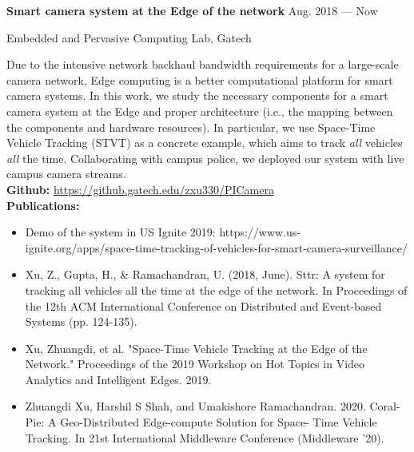 \parbox[t][][t]{\linewidth}{
	\parbox{\linewidth}{\textbf{Smart camera system at the Edge of the network}
		\hfill {{Aug. 2018 --- Now}}}
		\smallbreak
	\parbox{\linewidth}{Embedded and Pervasive Computing Lab, Gatech}
	
	\bigskip
  Due to the intensive network backhaul bandwidth requirements for a large-scale camera network, Edge computing is a better computational platform for smart camera systems.
  In this work, we study the necessary components for a smart camera system at the Edge and proper architecture (i.e., the mapping between the components and hardware resources).
  In particular, we use Space-Time Vehicle Tracking (STVT) as a concrete example, which aims to track \textit{all} vehicles \textit{all} the time.
  Collaborating with campus police, we deployed our system with live campus camera streams. \\
  \textbf{Github:} \url{https://github.gatech.edu/zxu330/PICamera} \\
  \textbf{Publications:}
	\begin{itemize}
    \item{Demo of the system in US Ignite 2019: https://www.us-ignite.org/apps/space-time-tracking-of-vehicles-for-smart-camera-surveillance/}\\
      [-1em]
    \item{Xu, Z., Gupta, H., \& Ramachandran, U. (2018, June). Sttr: A system for tracking all vehicles all the time at the edge of the network. In Proceedings of the 12th ACM International Conference on Distributed and Event-based Systems (pp. 124-135).}\\
      [-1em]
    \item{Xu, Zhuangdi, et al. "Space-Time Vehicle Tracking at the Edge of the Network." Proceedings of the 2019 Workshop on Hot Topics in Video Analytics and Intelligent Edges. 2019.}\\
      [-1em]
    \item{Zhuangdi Xu, Harshil S Shah, and Umakishore Ramachandran. 2020.
Coral-Pie: A Geo-Distributed Edge-compute Solution for Space-
Time Vehicle Tracking. In 21st International Middleware Conference (Middleware ’20).}\\
      [-1em]
	\end{itemize}
	\bigskip
}



